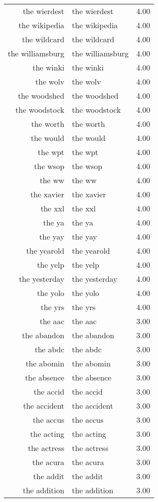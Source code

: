 \begin{table}[ht]
\begin{tabular}{rlr}
  the wierdest & the wierdest & 4.00 \\ 
  the wikipedia & the wikipedia & 4.00 \\ 
  the wildcard & the wildcard & 4.00 \\ 
  the williamsburg & the williamsburg & 4.00 \\ 
  the winki & the winki & 4.00 \\ 
  the wolv & the wolv & 4.00 \\ 
  the woodshed & the woodshed & 4.00 \\ 
  the woodstock & the woodstock & 4.00 \\ 
  the worth & the worth & 4.00 \\ 
  the would & the would & 4.00 \\ 
  the wpt & the wpt & 4.00 \\ 
  the wsop & the wsop & 4.00 \\ 
  the ww & the ww & 4.00 \\ 
  the xavier & the xavier & 4.00 \\ 
  the xxl & the xxl & 4.00 \\ 
  the ya & the ya & 4.00 \\ 
  the yay & the yay & 4.00 \\ 
  the yearold & the yearold & 4.00 \\ 
  the yelp & the yelp & 4.00 \\ 
  the yesterday & the yesterday & 4.00 \\ 
  the yolo & the yolo & 4.00 \\ 
  the yrs & the yrs & 4.00 \\ 
  the aac & the aac & 3.00 \\ 
  the abandon & the abandon & 3.00 \\ 
  the abdc & the abdc & 3.00 \\ 
  the abomin & the abomin & 3.00 \\ 
  the absence & the absence & 3.00 \\ 
  the accid & the accid & 3.00 \\ 
  the accident & the accident & 3.00 \\ 
  the accus & the accus & 3.00 \\ 
  the acting & the acting & 3.00 \\ 
  the actress & the actress & 3.00 \\ 
  the acura & the acura & 3.00 \\ 
  the addit & the addit & 3.00 \\ 
  the addition & the addition & 3.00 \\ 

\end{tabular}
\end{table}
